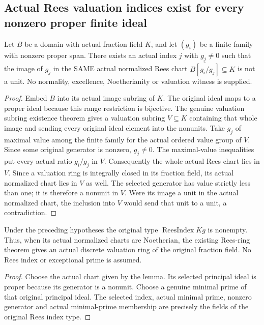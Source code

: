 \subsection{Actual Rees valuation indices exist for every nonzero proper finite ideal}

\begin{lemma}
\label{algebra:rees-index-nonunit-normalized-chart}
\leanok
{}
Let $B$ be a domain with actual fraction field $K$, and let $(g_i)$ be a finite
family with nonzero proper span. There exists an actual index $j$ with $g_j\ne0$
such that the image of $g_j$ in the SAME actual normalized Rees chart
$\overline{B[g_i/g_j]}\subseteq K$ is not a unit. No normality, excellence,
Noetherianity or valuation witness is supplied.
\end{lemma}
\begin{proof}
Embed $B$ into its actual image subring of $K$. The original ideal maps to a
proper ideal because this range restriction is bijective. The genuine valuation
subring existence theorem gives a valuation subring $V\subseteq K$ containing
that whole image and sending every original ideal element into the nonunits.
Take $g_j$ of maximal value among the finite family for the actual ordered
value group of $V$. Since some original generator is nonzero, $g_j\ne0$.
The maximal-value inequalities put every actual ratio $g_i/g_j$ in $V$.
Consequently the whole actual Rees chart lies in $V$. Since a valuation ring is
integrally closed in its fraction field, its actual normalized chart lies in
$V$ as well. The selected generator has value strictly less than one; it is
therefore a nonunit in $V$. Were its image a unit in the actual normalized chart,
the inclusion into $V$ would send that unit to a unit, a contradiction.
\end{proof}

\begin{theorem}
\label{algebra:actual-rees-index-exists}
\leanok
{}
Under the preceding hypotheses the original type $\operatorname{ReesIndex} K g$
is nonempty. Thus, when its actual normalized charts are Noetherian, the existing
Rees-ring theorem gives an actual discrete valuation ring of the original
fraction field. No Rees index or exceptional prime is assumed.
\end{theorem}
\begin{proof}
Choose the actual chart given by the lemma. Its selected principal ideal is
proper because its generator is a nonunit. Choose a genuine minimal prime of
that original principal ideal. The selected index, actual minimal prime,
nonzero generator and actual minimal-prime membership are precisely the fields
of the original Rees index type.
\end{proof}
